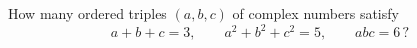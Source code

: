 How many ordered triples \((a,b,c)\) of complex numbers satisfy
\[
a+b+c=3,\qquad a^2+b^2+c^2=5,\qquad abc=6\,?
\]
